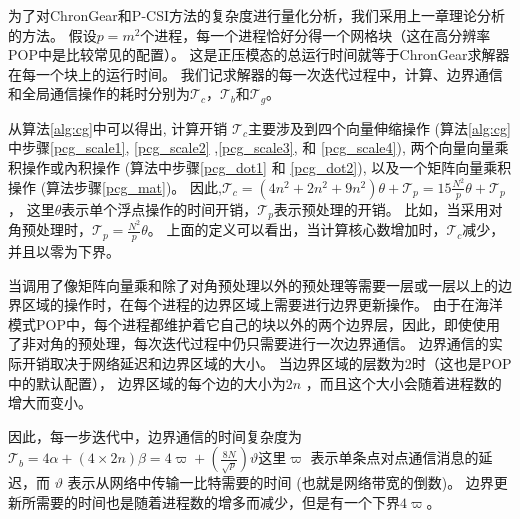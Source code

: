 为了对ChronGear和P-CSI方法的复杂度进行量化分析，我们采用上一章理论分析的方法。
假设$p=m^2$个进程，每一个进程恰好分得一个网格块（这在高分辨率POP中是比较常见的配置）。 
这是正压模态的总运行时间就等于ChronGear求解器在每一个块上的运行时间。 
我们记求解器的每一次迭代过程中，计算、边界通信和全局通信操作的耗时分别为$\mathcal{T}_c$，$\mathcal{T}_b$和$\mathcal{T}_g$。 


从算法\ref{alg:cg}中可以得出, 计算开销
$\mathcal{T}_c$主要涉及到四个向量伸缩操作 (算法\ref{alg:cg}中步骤\ref{pcg_scale1}, \ref{pcg_scale2} ,\ref{pcg_scale3}, 和
\ref{pcg_scale4}), 两个向量向量乘积操作或內积操作 (算法中步骤\ref{pcg_dot1} 和 \ref{pcg_dot2}), 以及一个矩阵向量乘积操作 (算法步骤\ref{pcg_mat})。
因此,$\mathcal{T}_c= (4 n^2 +2n^2+ 9n^2)\theta + \mathcal{T}_{p}=15\frac{N^2}{p}\theta+\mathcal{T}_{p}$，
这里$\theta$表示单个浮点操作的时间开销，$\mathcal{T}_{p}$表示预处理的开销。
比如，当采用对角预处理时，$\mathcal{T}_{p} =\frac{N^2}{p}\theta$。
上面的定义可以看出，当计算核心数增加时，$\mathcal{T}_c$减少，并且以零为下界。

 
当调用了像矩阵向量乘和除了对角预处理以外的预处理等需要一层或一层以上的边界区域的操作时，在每个进程的边界区域上需要进行边界更新操作。 
由于在海洋模式POP中，每个进程都维护着它自己的块以外的两个边界层，因此，即使使用了非对角的预处理，每次迭代过程中仍只需要进行一次边界通信。
边界通信的实际开销取决于网络延迟和边界区域的大小。 当边界区域的层数为2时（这也是POP中的默认配置）， 边界区域的每个边的大小为$2n$ ，而且这个大小会随着进程数的增大而变小。 
 
因此，每一步迭代中，边界通信的时间复杂度为$\mathcal{T}_b =4\alpha +(4\times 2n)\beta=4\varpi +(\frac{8N}{\sqrt{p}})\vartheta $这里$\varpi$ 表示单条点对点通信消息的延迟，而
$\vartheta$ 表示从网络中传输一比特需要的时间 (也就是网络带宽的倒数)。
边界更新所需要的时间也是随着进程数的增多而减少，但是有一个下界$4\varpi$。 

